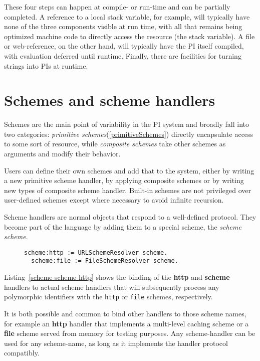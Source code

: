 \documentclass[preprint,authoryear]{acm_proc_article-sp}
\begin{document}
These four steps can happen at compile- or run-time and can be partially completed.
A reference to a local stack variable, for example, will typically have none of the
three components visible at run time, with all that remains being optimized 
machine code to directly access the resource (the stack variable).
A file or web-reference, on the other hand, will typically have the PI itself
compiled, with evaluation deferred until runtime.  Finally, there are facilities
for turning strings into PIs at runtime.


\section{Schemes and scheme handlers}
\label{schemes}
Schemes are the main point of variability in the PI system
and broadly fall into two categories:   {\em primitive schemes}(\ref{primitiveSchemes})
directly encapsulate access to some sort of resource, while {\em composite schemes} 
take other schemes as arguments and modify their behavior.


Users can define their own schemes and add that 
to the system, either by writing
a new primitive scheme handler, by applying composite schemes or by writing new types
of composite scheme handler.  Built-in schemes are not privileged over user-defined
schemes except where necessary to avoid infinite recursion.

Scheme handlers are normal objects that respond to a well-defined protocol.  They
become part of the language by adding them to a special scheme, the {\em scheme scheme}.

\begin{figure}[htbp]
\begin{lstlisting}[style=L,label=scheme-scheme-http,caption=Adding the http and file schemes.]
  scheme:http := URLSchemeResolver scheme.
  scheme:file := FileSchemeResolver scheme.
\end{lstlisting}
\end{figure}

Listing~\ref{scheme-scheme-http} shows the binding of the {\bf http} and {\bf scheme}
handlers to actual scheme handlers that will subsequently process any polymorphic
identifiers with the {\tt http} or {\tt file} schemes, respectively. 

It is both possible and common to bind other handlers to those scheme
names, for example an {\bf http} handler that implements a multi-level caching scheme
or a {\bf file} scheme served from memory for testing purposes.  Any scheme-handler
can be used for any scheme-name, as long as it implements the handler protocol
compatibly.
\end{document}
